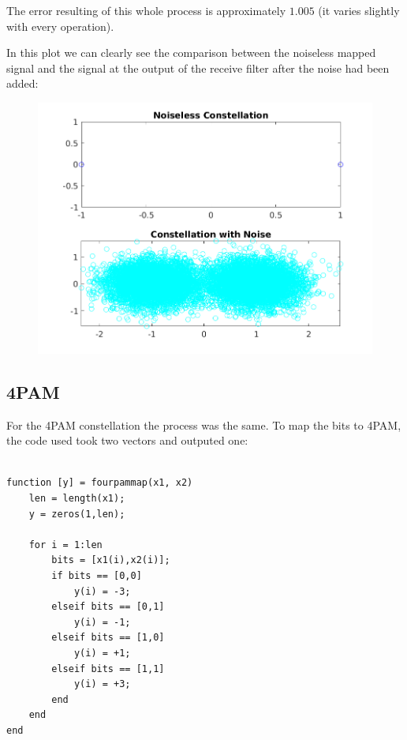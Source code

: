 \documentclass[a4paper,11pt]{article}
\begin{document}
The error resulting of this whole process is approximately $1.005$ (it varies
slightly with every operation).

In this plot we can clearly see the comparison between the noiseless mapped
signal and the signal at the output of the receive filter after the noise had
been added:

\begin{figure}[!hp]
    \begin{center}
      \includegraphics[width=1\textwidth]{images/BPSK.png}
    \end{center}
\end{figure}

\newpage

\subsection{4PAM}

For the 4PAM constellation the process was the same. To map the bits to 4PAM,
the code used took two vectors and outputed one:

\bigskip
\begin{lstlisting}

function [y] = fourpammap(x1, x2)
    len = length(x1);
    y = zeros(1,len);

    for i = 1:len
        bits = [x1(i),x2(i)];
        if bits == [0,0]
            y(i) = -3;
        elseif bits == [0,1]
            y(i) = -1;
        elseif bits == [1,0]
            y(i) = +1;
        elseif bits == [1,1]
            y(i) = +3;
        end
    end
end

\end{lstlisting}
\bigskip
\end{document}
